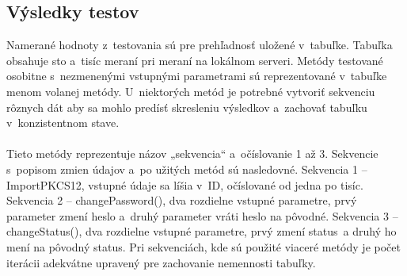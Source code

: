 \documentclass[
  digital, %
  table,   %
oneside,
  nolof,     %
  nolot,     %
]{fithesis3}
\begin{document}
\subsection{Výsledky testov}
Namerané hodnoty z~testovania sú pre prehľadnosť uložené v~tabuľke. Tabuľka obsahuje sto a~tisíc meraní pri meraní na lokálnom serveri. Metódy testované osobitne s~nezmenenými vstupnými parametrami sú reprezentované v~tabuľke menom volanej metódy. U~niektorých metód je potrebné vytvoriť sekvenciu rôznych dát aby sa mohlo predísť skresleniu výsledkov a~zachovať tabuľku v~konzistentnom stave. \paragraph{}
Tieto metódy reprezentuje názov „sekvencia“ a~očíslovanie 1 až 3. Sekvencie s~popisom zmien údajov  a~po užitých metód sú nasledovné.
Sekvencia 1 – ImportPKCS12, vstupné údaje sa líšia v~ID, očíslované od jedna po tisíc. \newline
Sekvencia 2 – changePassword(), dva rozdielne vstupné parametre, prvý parameter zmení heslo  a~druhý parameter vráti heslo na pôvodné.\newline
Sekvencia 3 – changeStatus(), dva rozdielne vstupné parametre, prvý zmení status~a druhý ho mení na pôvodný status. \newline
Pri sekvenciách, kde sú použité viaceré metódy je počet iterácii adekvátne upravený pre zachovanie nemennosti tabuľky. 
\begin{table}[htbp]
	\begin{center}
	\end{center}
	\caption{Ukážka nameraných hodnôt}
	\label{table:100}
\end{table}
\end{document}
